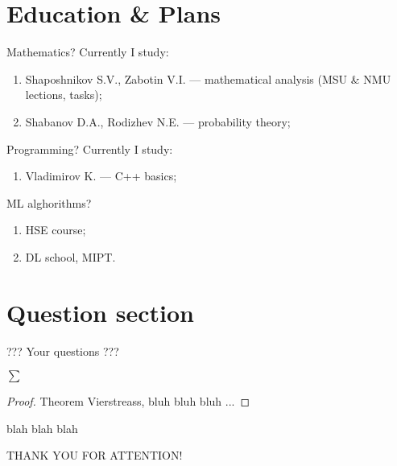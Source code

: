 \section{Education \& Plans}
\begin{frame}{Mathematics?}
  Currently I study:
  \begin{enumerate}
    \item Shaposhnikov S.V., Zabotin V.I. --- mathematical analysis (MSU \& NMU lections, tasks);
    \item Shabanov D.A., Rodizhev N.E. --- probability theory;
  \end{enumerate}
\end{frame}

\begin{frame}{Programming?}
  Currently I study:
  \begin{enumerate}
    \item Vladimirov K. --- C++ basics;
  \end{enumerate}
  ML alghorithms?
  \begin{enumerate}
    \item HSE course;
    \item DL school, MIPT.
  \end{enumerate}
\end{frame}

\section{Question section}
\begin{frame}
  \Huge {\color{cscgreen} ???} Your questions {\color{cscgreen} ???}
\end{frame}

\begin{frame}
  \begin{theorem}
    \( \sum \)
  \end{theorem}
  \begin{proof}
    Theorem Vierstreass, bluh bluh bluh ...
  \end{proof}
  \begin{remark}
    blah blah blah \Warning
  \end{remark}

\end{frame}

\begin{frame}
  \Huge {\color{cscgreen} THANK YOU FOR ATTENTION!}
\end{frame}


